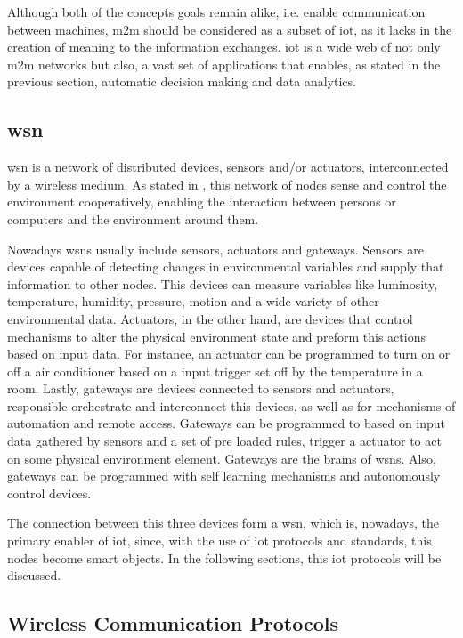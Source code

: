 Although both of the concepts goals remain alike, i.e. enable communication between machines, \ac{m2m} should be considered as a subset of \ac{iot}, as it lacks in the creation of meaning to the information exchanges. \ac{iot} is a wide web of not only \ac{m2m} networks but also, a vast set of applications that enables, as stated in the previous section, automatic decision making and data analytics. 

\subsection{\acf{wsn}}

\acf{wsn} is a network of distributed devices, sensors and/or actuators, interconnected by a wireless medium. As stated in \cite{IEC2014a}, this network of nodes sense and control the environment cooperatively, enabling the interaction between persons or computers and the environment around them. 

Nowadays \ac*{wsn}s usually include sensors, actuators and gateways. Sensors are devices capable of detecting changes in environmental variables and supply that information to other nodes. This devices can measure variables like luminosity, temperature, humidity, pressure, motion and a wide variety of other environmental data. Actuators, in the other hand, are devices that control mechanisms to alter the physical environment state and preform this actions based on input data. For instance, an actuator can be programmed to turn on or off a air conditioner based on a input trigger set off by the temperature in a room.
Lastly, gateways are devices connected to sensors and actuators, responsible orchestrate and interconnect this devices, as well as for mechanisms of automation and remote access. Gateways can be programmed to based on input data gathered by sensors and a set of pre loaded rules, trigger a actuator to act on some physical environment element. Gateways are the brains of \ac{wsn}s. Also, gateways can be programmed with self learning mechanisms and autonomously control devices. 

The connection between this three devices form a \ac{wsn}, which is, nowadays, the primary enabler of \ac{iot}, since, with the use of \ac{iot} protocols and standards, this nodes become smart objects. In the following sections, this \ac{iot} protocols will be discussed.




\subsection{Wireless Communication Protocols}

